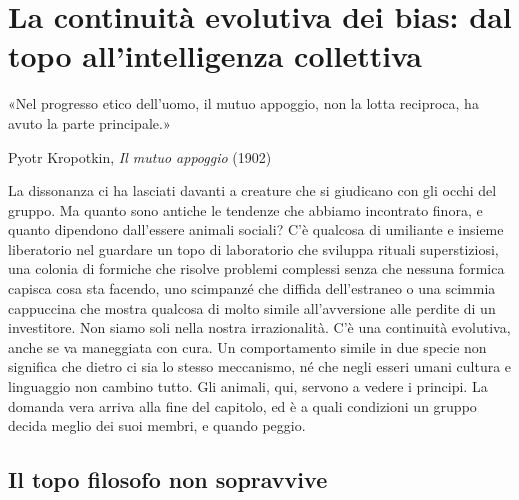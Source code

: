 \chapter{La continuità evolutiva dei bias: dal topo all'intelligenza collettiva}
\label{cap:p1c9}

\epigraph{«Nel progresso etico dell'uomo, il mutuo appoggio, non la lotta reciproca, ha avuto la parte principale.»}{Pyotr Kropotkin, \textit{Il mutuo appoggio} (1902)}

La dissonanza ci ha lasciati davanti a creature che si giudicano con gli occhi del gruppo. Ma quanto sono antiche le tendenze che abbiamo incontrato finora, e quanto dipendono dall'essere animali sociali? C'è qualcosa di umiliante e insieme liberatorio nel guardare un topo di laboratorio che sviluppa rituali superstiziosi, una colonia di formiche che risolve problemi complessi senza che nessuna formica capisca cosa sta facendo, uno scimpanzé che diffida dell'estraneo o una scimmia cappuccina che mostra qualcosa di molto simile all'avversione alle perdite di un investitore. Non siamo soli nella nostra irrazionalità. C'è una continuità evolutiva, anche se va maneggiata con cura. Un comportamento simile in due specie non significa che dietro ci sia lo stesso meccanismo, né che negli esseri umani cultura e linguaggio non cambino tutto. Gli animali, qui, servono a vedere i principi. La domanda vera arriva alla fine del capitolo, ed è a quali condizioni un gruppo decida meglio dei suoi membri, e quando peggio.

\section{Il topo filosofo non sopravvive}
\label{sec:p1c9-topo-filosofo}

